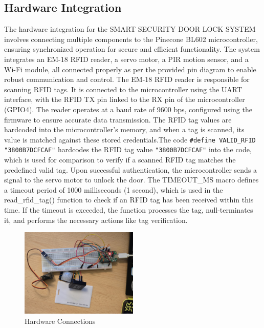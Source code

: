 \documentclass[USenglish,oneside,twocolumn]{article}
\begin{document}
\subsection{Hardware Integration}

The hardware integration for the SMART SECURITY DOOR LOCK SYSTEM involves connecting multiple components to the Pinecone BL602 microcontroller, ensuring synchronized operation for secure and efficient functionality. The system integrates an EM-18 RFID reader, a servo motor, a PIR motion sensor, and a Wi-Fi module, all connected properly as per the provided pin diagram to enable robust communication and control. The EM-18 RFID reader is responsible for scanning RFID tags. It is connected to the microcontroller using the UART interface, with the RFID TX pin linked to the RX pin of the microcontroller (GPIO4). The reader operates at a baud rate of 9600 bps, configured using the firmware to ensure accurate data transmission. The RFID tag values are hardcoded into the microcontroller's memory, and when a tag is scanned, its value is matched against these stored credentials.The code \texttt{\#define VALID\_RFID "3800B7DCFCAF"} hardcodes the RFID tag value \texttt{"3800B7DCFCAF"} into the code, which is used for comparison to verify if a scanned RFID tag matches the predefined valid tag.
 Upon successful authentication, the microcontroller sends a signal to the servo motor\cite{MG996RServoMotor} to unlock the door. The TIMEOUT\_MS macro defines a timeout period of 1000 milliseconds (1 second), which is used in the read\_rfid\_tag() function to check if an RFID tag has been received within this time. If the timeout is exceeded, the function processes the tag, null-terminates it, and performs the necessary actions like tag verification.

\begin{figure}[h!]
    \centering
    \includegraphics[width=0.5\textwidth]{hardware_connections.jpeg}
    \caption{Hardware Connections}
    \label{fig:hardware_connections}
\end{figure}
\end{document}

